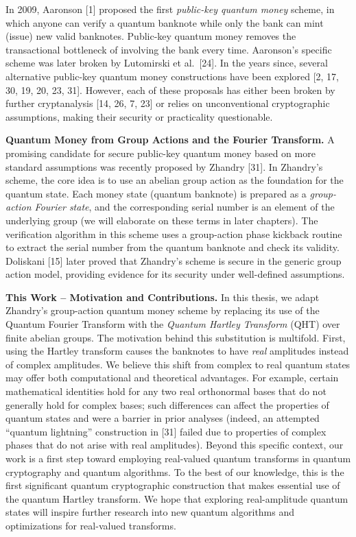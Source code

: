 \documentclass[11pt]{article}
\theoremstyle{definition}
\begin{document}
In 2009, Aaronson [1] proposed the first \emph{public-key quantum money} scheme, in which anyone can verify a quantum banknote while only the bank can mint (issue) new valid banknotes. Public-key quantum money removes the transactional bottleneck of involving the bank every time. Aaronson’s specific scheme was later broken by Lutomirski et al.~[24]. In the years since, several alternative public-key quantum money constructions have been explored [2, 17, 30, 19, 20, 23, 31]. However, each of these proposals has either been broken by further cryptanalysis [14, 26, 7, 23] or relies on unconventional cryptographic assumptions, making their security or practicality questionable.

\medskip\noindent\textbf{Quantum Money from Group Actions and the Fourier Transform.} 
A promising candidate for secure public-key quantum money based on more standard assumptions was recently proposed by Zhandry [31]. In Zhandry’s scheme, the core idea is to use an abelian group action as the foundation for the quantum state. Each money state (quantum banknote) is prepared as a \emph{group-action Fourier state}, and the corresponding serial number is an element of the underlying group (we will elaborate on these terms in later chapters). The verification algorithm in this scheme uses a group-action phase kickback routine to extract the serial number from the quantum banknote and check its validity. Doliskani [15] later proved that Zhandry’s scheme is secure in the generic group action model, providing evidence for its security under well-defined assumptions.

\medskip\noindent\textbf{This Work – Motivation and Contributions.} 
In this thesis, we adapt Zhandry’s group-action quantum money scheme by replacing its use of the Quantum Fourier Transform with the \emph{Quantum Hartley Transform} (QHT) over finite abelian groups. The motivation behind this substitution is multifold. First, using the Hartley transform causes the banknotes to have \emph{real} amplitudes instead of complex amplitudes. We believe this shift from complex to real quantum states may offer both computational and theoretical advantages. For example, certain mathematical identities hold for any two real orthonormal bases that do not generally hold for complex bases; such differences can affect the properties of quantum states and were a barrier in prior analyses (indeed, an attempted “quantum lightning” construction in [31] failed due to properties of complex phases that do not arise with real amplitudes). Beyond this specific context, our work is a first step toward employing real-valued quantum transforms in quantum cryptography and quantum algorithms. To the best of our knowledge, this is the first significant quantum cryptographic construction that makes essential use of the quantum Hartley transform. We hope that exploring real-amplitude quantum states will inspire further research into new quantum algorithms and optimizations for real-valued transforms.
\end{document}
